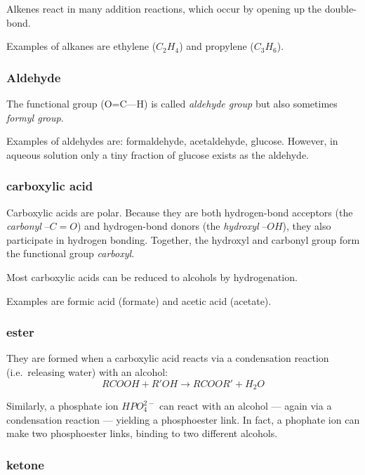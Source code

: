 \documentclass{article}
\begin{document}
Alkenes react in many addition reactions, which occur by opening up the double-bond.

Examples of alkanes are ethylene ($C_2H_4$) and propylene ($C_3H_6$).

\subsubsection{Aldehyde}


The functional group (O=C---H) is called {\em aldehyde group\/} but also sometimes {\em
formyl group}.

Examples of aldehydes are: formaldehyde, acetaldehyde, glucose. However, in aqueous
solution only a tiny fraction of glucose exists as the aldehyde.

\subsubsection{carboxylic acid}

Carboxylic acids are polar. Because they are both hydrogen-bond acceptors (the {\em
carbonyl\/} $–C=O$) and hydrogen-bond donors (the {\em hydroxyl\/} $–OH$), they also
participate in hydrogen bonding. Together, the hydroxyl and carbonyl group form the
functional group {\em carboxyl}.

Most carboxylic acids can be reduced to alcohols by hydrogenation.

Examples are formic acid (formate) and acetic acid (acetate).

\subsubsection{ester}

They are formed when a carboxylic acid reacts via a condensation reaction (i.e.\ releasing
water) with an alcohol:
\[
    RCOOH + R'OH \rightarrow RCOOR' + H_2O
\]

Similarly, a phosphate ion $HPO_4^{2-}$ can react with an alcohol --- again via a
condensation reaction --- yielding a phosphoester link. In fact, a phophate ion can make
two phosphoester links, binding to two different alcohols.

\subsubsection{ketone}
\end{document}
